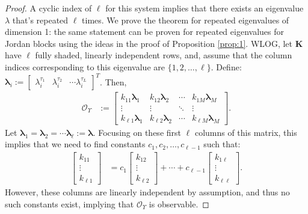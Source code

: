 \documentclass[letterpaper,12pt,peerreviewca,draftcls]{IEEEtran}
\newcommand{\la}{\lambda}
\newcommand{\eval}{\la}
\newcommand{\empK}{\ensuremath{K}}
\newcommand{\ncent}{M}
\newcommand{\Obs}{\mathcal{O}}
\newcommand{\otime}{L}
\newcommand{\Tset}{\Upsilon}
\newcommand{\minmeas}{\ell}
\newcommand{\empKShadFull}{\mathbf{\empK}}
\newcommand{\tindex}{\tau}
\newcommand{\evalvec}{\boldsymbol{\eval}}
\begin{document}
\begin{proof}
	A cyclic index of $\minmeas$ for this system implies that there exists an eigenvalue $\eval$ that's repeated $\minmeas$ times. We prove the theorem for repeated eigenvalues of dimension 1: the same statement can be proven for repeated eigenvalues for Jordan blocks using the ideas in the proof of Proposition \ref{prop:1}. 
	WLOG, let $\empKShadFull$ have $\minmeas$ fully shaded, linearly independent rows, and, assume that the column indices corresponding to this eigenvalue are $\{1,2,\dots,\minmeas\}$. Define: 
	$\evalvec_i:= \begin{bmatrix}\eval_i^{\tindex_1} & \eval_i^{\tindex_2} & \cdots \eval_i^{\tindex_{\otime}}\end{bmatrix}^T$. Then,
	\begin{align*}
	\Obs_{\Tset}
	&:= 
	\begin{bmatrix}
	k_{11} \evalvec_1 & k_{12} \evalvec_2 & \cdots & k_{1\ncent} \evalvec_{\ncent}\\
	\vdots & \vdots & \ddots & \vdots\\
	k_{\minmeas 1} \evalvec_1 & k_{\minmeas 2} \evalvec_2 & \cdots & k_{\minmeas \ncent} \evalvec_{\ncent}
	\end{bmatrix}.
	\end{align*}
	Let $\evalvec_1 = \evalvec_2 = \cdots \evalvec_{\minmeas} := \evalvec$. 
	Focusing on these first $\minmeas$ columns of this matrix, this implies that
	we need to find constants $c_1,c_2,\dots, c_{\minmeas-1}$ such that:
	\begin{align*}
	\begin{bmatrix}
	k_{11}\\
	\vdots\\
	k_{\minmeas 1}
	\end{bmatrix}
	&= 
	c_1 
	\begin{bmatrix}
	k_{12}\\
	\vdots\\
	k_{\minmeas 2}
	\end{bmatrix}
	+ \cdots + 
	c_{\minmeas-1} 
	\begin{bmatrix}
	k_{1\minmeas}\\   
	\vdots\\
	k_{\minmeas \minmeas} 
	\end{bmatrix}.
	\end{align*}
	However, these columns are linearly independent by assumption, and thus no such constants exist, implying that $\Obs_{\Tset}$ is observable. 
\end{proof}
\end{document}
